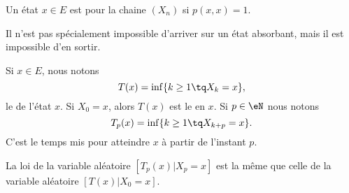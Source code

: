 \begin{definition}      \label{DEFooFIQUooScQDMI}
	Un état \( x\in E\) est  pour la chaine \( (X_n)\) si \( p(x,x)=1\).
\end{definition}
Il n'est pas spécialement impossible d'arriver sur un état absorbant, mais il est impossible d'en sortir.

Si \( x\in E\), nous notons
\begin{equation}
	T(x)=\inf\{ k\geq 1\tq X_k=x \},
\end{equation}
le  de l'état \( x\). Si \( X_0=x\), alors \( T(x)\) est le  en \( x\). Si \( p\in \eN\) nous notons
\begin{equation}
	T_p(x)=\inf\{ k\geq 1\tq X_{k+p}=x \}.
\end{equation}
C'est le temps mis pour atteindre \( x\) à partir de l'instant \( p\).

\begin{proposition}
	La loi de la variable aléatoire \( [T_p(x)|X_p=x]\) est la même que celle de la variable aléatoire \( [T(x)|X_0=x]\).
\end{proposition}

